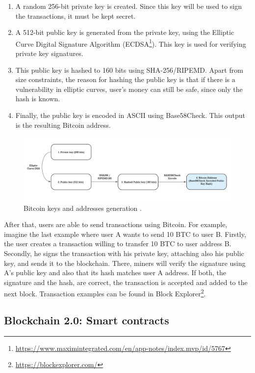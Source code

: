 \begin{enumerate}
	
	\item A random 256-bit private key is created. Since this key will be used to sign the transactions, it must be kept secret.
	\item A 512-bit public key is generated from the private key, using the Elliptic Curve Digital Signature Algorithm (ECDSA\footnote{\url{https://www.maximintegrated.com/en/app-notes/index.mvp/id/5767}}). This key is used for verifying private key signatures.
	\item This public key is hashed to 160 bits using SHA-256/RIPEMD. Apart from size constraints, the reason for hashing the public key is that if there is a vulnerability in elliptic curves, user's money can still be safe, since only the hash is known.
	\item Finally, the public key is encoded in ASCII using Base58Check. This output is the resulting Bitcoin address.
	
\end{enumerate}

\begin{figure}[bth]
  \centering
  \includegraphics[width=0.9\linewidth]{gfx/bitkeys}    
  \caption{Bitcoin keys and addresses generation \citep{BitcoinKey2018}.}
  \label{fig:EthereumAccounts}
\end{figure}

After that, users are able to send transactions using Bitcoin. For example, imagine the last example where user A wants to send 10 BTC to user B. Firstly, the user creates a transaction willing to transfer 10 BTC to user address B. Secondly, he signs the transaction with his private key, attaching also his public key, and sends it to the blockchain. There, miners will verify the signature using A's public key and also that its hash matches user A address. If both, the signature and the hash, are correct, the transaction is accepted and added to the next block. Transaction examples can be found in Block Explorer\footnote{\url{https://blockexplorer.com/}}.

\subsection{Blockchain 2.0: Smart contracts} \label{smartContracts}

